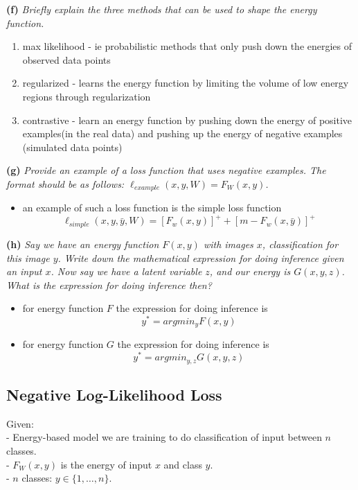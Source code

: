 \documentclass{article}
\begin{document}
\textbf{(f)}
\textit{Briefly explain the three methods that can be used to shape the energy function.}
\begin{enumerate}
    \color{red}
    \item max likelihood - ie probabilistic methods that only push down the energies of observed data points 
    \item regularized - learns the energy function by limiting the volume of low energy regions through regularization
    \item contrastive - learn an energy function by pushing down the energy of positive examples(in the real data) and pushing up the energy of negative examples (simulated data points)
\end{enumerate}
\textbf{(g)}
\textit{Provide an example of a loss function that uses negative examples. The format should be as follows: $\ell_{example}(x, y, W) = F_W(x, y)$.}
\begin{itemize}
    \color{red}
    \item an example of such a loss function is the simple loss function $$\ell_{simple}(x,y,\bar{y}, W)=[F_{w}(x,y)]^{+}+[m - F_{w}(x,\bar{y})]^{+}$$
\end{itemize}
\textbf{(h)}
\textit{Say we have an energy function $F(x, y)$ with images $x$, classification for this image $y$. Write down the mathematical expression for doing inference given an input $x$. Now say we have a latent variable $z$, and our energy is $G(x, y, z)$. What is the expression for doing inference then?}
\begin{itemize}
    \color{red}
    \item for energy function $F$ the expression for doing inference is $$y^{*}=argmin_{y}F(x,y)$$
    \item for energy function $G$ the expression for doing inference is $$y^{*}=argmin_{y,z}G(x,y,z)$$
\end{itemize}

\subsection{Negative Log-Likelihood Loss}
Given: \\
- Energy-based model we are training to do classification of input between $n$ classes. \\
- $F_W(x, y)$ is the energy of input $x$ and class $y$. \\
- $n$ classes: $y\in\{1,\dots,n\}$. \\
\end{document}
